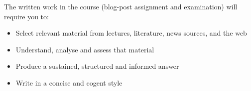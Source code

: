 \noindent The written work in the course (blog-post assignment and examination) will require you to:

\begin{itemize}
	\item Select relevant material from lectures, literature, news sources, and the web
	\item Understand, analyse and assess that material
	\item Produce a sustained, structured and informed answer
	\item Write in a concise and cogent style
\end{itemize}
